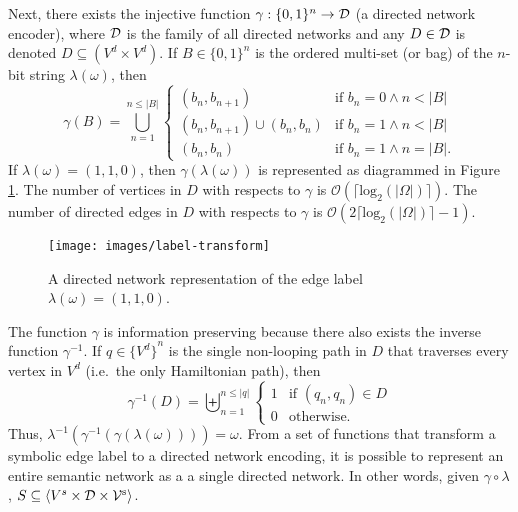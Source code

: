 \documentclass[twocolumn,preprintnumbers,amsmath,amssymb,letter]{revtex4}
\newcommand{\rar}{\rightarrow}
\newcommand{\ra}{\rangle}
\newcommand{\la}{\langle}
\begin{document}
Next, there exists the injective function $\gamma: \{0,1\}^n \rar \cal{D}$ (a directed network encoder), where $\cal{D}$ is the family of all directed networks and any $D \in \cal{D}$ is denoted $D \subseteq (V^d \times V^d)$. If $B \in \{0,1\}^n$ is the ordered multi-set (or bag) of the $n$-bit string $\lambda(\omega)$, then
\begin{equation*}
	\gamma(B) = \bigcup^{n \leq |B|}_{n=1} 	
	\begin{cases}
		(b_n,b_{n+1}) & \text{if } b_n=0 \wedge n < |B|\\
		(b_n,b_{n+1}) \cup (b_n,b_n) & \text{if } b_n=1 \wedge n < |B| \\
		(b_n,b_n) & \text{if } b_n=1 \wedge n = |B|.
	\end{cases}
\end{equation*}
If $\lambda(\omega) = (1,1,0)$, then $\gamma(\lambda(\omega))$ is represented as diagrammed in Figure \ref{fig:label-transform}. The number of vertices in $D$ with respects to $\gamma$ is $\mathcal{O}(\lceil\text{log}_2(|\Omega|)\rceil)$. The number of directed edges in $D$ with respects to $\gamma$ is $\mathcal{O}(2\lceil\text{log}_2(|\Omega|)\rceil-1)$. 
\begin{figure}[h!]
	\centering
	\texttt{[image: images/label-transform]}
	 \caption{\label{fig:label-transform}A directed network representation of the edge label $\lambda(\omega) = (1,1,0)$.}
\end{figure}

The function $\gamma$ is information preserving because there also exists the inverse function $\gamma^{-1}$. If $q \in {\{V^d\}}^n$ is the single non-looping path in $D$ that traverses every vertex in $V^d$ (i.e.~the only Hamiltonian path), then
\begin{equation*}
	\gamma^{-1}(D) = \biguplus_{n=1}^{n \leq |q|}
	\begin{cases}
		1 & \text{if } (q_n,q_n) \in D \\
		0 & \text{otherwise}.
	\end{cases}
\end{equation*}
Thus, $\lambda^{-1}(\gamma^{-1}(\gamma(\lambda(\omega)))) = \omega$. From a set of functions that transform a symbolic edge label to a directed network encoding, it is possible to represent an entire semantic network as a a single directed network. In other words, given $\gamma \circ \lambda$, $S \subseteq \la V^{s} \times \cal{D} \times V^{\text{s}} \ra$.
\end{document}
